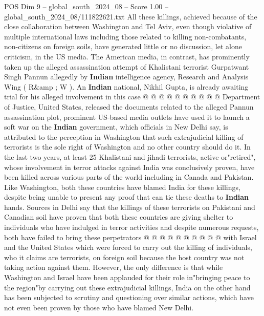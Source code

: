 \begin{textsample}{POS Dim 9 – global\_south\_2024\_08 – Score 1.00 – global\_south\_2024\_08/111822621.txt}
All these killings, achieved because of the close collaboration between Washington and Tel Aviv, even though violative of multiple international laws including those related to killing non-combatants, non-citizens on foreign soils, have generated little or no discussion, let alone criticism, in the US media.
The American media, in contrast, has prominently taken up the alleged assassination attempt of Khalistani terrorist Gurpatwant Singh Pannun allegedly by \textbf{Indian} intelligence agency, Research and Analysis Wing ( R\&amp ; W ).
An \textbf{Indian} national, Nikhil Gupta, is already awaiting trial for his alleged involvement in this case @ @ @ @ @ @ @ @ @ @ Department of Justice, United States, released the documents related to the alleged Pannun assassination plot, prominent US-based media outlets have used it to launch a soft war on the \textbf{Indian} government, which officials in New Delhi say, is attributed to the perception in Washington that such extrajudicial killing of terrorists is the sole right of Washington and no other country should do it.
In the last two years, at least 25 Khalistani and jihadi terrorists, active or"retired", whose involvement in terror attacks against India was conclusively proven, have been killed across various parts of the world including in Canada and Pakistan.
Like Washington, both these countries have blamed India for these killings, despite being unable to present any proof that can tie these deaths to \textbf{Indian} hands.
Sources in Delhi say that the killings of these terrorists on Pakistani and Canadian soil have proven that both these countries are giving shelter to individuals who have indulged in terror activities and despite numerous requests, both have failed to bring these perpetrators @ @ @ @ @ @ @ @ @ @ with Israel and the United States which were forced to carry out the killing of individuals, who it claims are terrorists, on foreign soil because the host country was not taking action against them.
However, the only difference is that while Washington and Israel have been applauded for their role in"bringing peace to the region"by carrying out these extrajudicial killings, India on the other hand has been subjected to scrutiny and questioning over similar actions, which have not even been proven by those who have blamed New Delhi.

\end{textsample}
